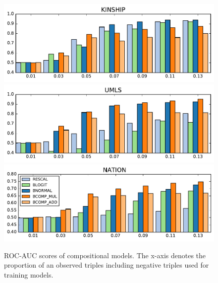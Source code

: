 \begin{figure}[t]
	\centering
	\includegraphics[width=\linewidth]{images/comp_training_error_kinship_small.pdf}
	\includegraphics[width=\linewidth]{images/comp_training_error_umls_small.pdf}			
	\includegraphics[width=\linewidth]{images/comp_training_error_nation_small.pdf}				
	\caption{\label{fig:r_vs_br} ROC-AUC scores of compositional models. 
	The x-axis denotes the proportion of an observed triples including negative triples used for training 
	models. %
}
\end{figure} 


